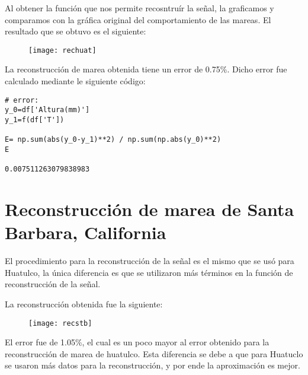 \documentclass[12pt]{article}
\begin{document}
Al obtener la función que nos permite recosntruír la señal, la graficamos y comparamos con la gráfica original del comportamiento de las mareas. El resultado que se obtuvo es el siguiente:


\begin{figure}[ht]
\texttt{[image: rechuat]}
\centering
\end{figure}

La reconstrucción de marea obtenida tiene un error de 0.75\%. Dicho error fue calculado mediante le siguiente código:


\begin{verbatim}
# error:
y_0=df['Altura(mm)']
y_1=f(df['T'])

E= np.sum(abs(y_0-y_1)**2) / np.sum(np.abs(y_0)**2)
E

0.007511263079838983
\end{verbatim}

\section*{Reconstrucción de marea de Santa Barbara, California}

El procedimiento para la reconstrucción de la señal es el mismo que se usó para Huatulco, la única diferencia es que se utilizaron más términos en la función de reconstrucción de la señal.

La reconstrucción obtenida fue la siguiente:

\begin{figure}[ht]
\texttt{[image: recstb]}
\centering
\end{figure}

El error fue de 1.05\%, el cual es un poco mayor al error obtenido para la reconstrucción de marea de huatulco. Esta diferencia se debe a que para Huatuclo se usaron más datos para la reconstrucción, y por ende la aproximación es mejor.

\newpage 

\renewcommand{\refname}{\section*{Bibliografía}}
\end{document}
